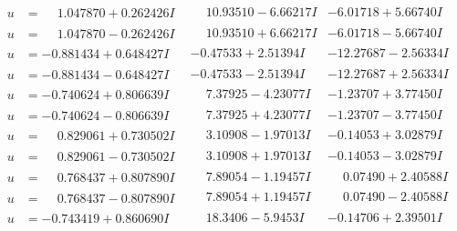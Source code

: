 \documentclass[1p]{elsarticle_modified}
\theoremstyle{definition}
\begin{document}
$$\begin{array}{c|c|c}
\begin{aligned}
u &= \phantom{-}1.047870 + 0.262426 I\end{aligned}
 & \phantom{-}10.93510 - 6.66217 I & -6.01718 + 5.66740 I \\ \hline\begin{aligned}
u &= \phantom{-}1.047870 - 0.262426 I\end{aligned}
 & \phantom{-}10.93510 + 6.66217 I & -6.01718 - 5.66740 I \\ \hline\begin{aligned}
u &= -0.881434 + 0.648427 I\end{aligned}
 & -0.47533 + 2.51394 I & -12.27687 - 2.56334 I \\ \hline\begin{aligned}
u &= -0.881434 - 0.648427 I\end{aligned}
 & -0.47533 - 2.51394 I & -12.27687 + 2.56334 I \\ \hline\begin{aligned}
u &= -0.740624 + 0.806639 I\end{aligned}
 & \phantom{-}7.37925 - 4.23077 I & -1.23707 + 3.77450 I \\ \hline\begin{aligned}
u &= -0.740624 - 0.806639 I\end{aligned}
 & \phantom{-}7.37925 + 4.23077 I & -1.23707 - 3.77450 I \\ \hline\begin{aligned}
u &= \phantom{-}0.829061 + 0.730502 I\end{aligned}
 & \phantom{-}3.10908 - 1.97013 I & -0.14053 + 3.02879 I \\ \hline\begin{aligned}
u &= \phantom{-}0.829061 - 0.730502 I\end{aligned}
 & \phantom{-}3.10908 + 1.97013 I & -0.14053 - 3.02879 I \\ \hline\begin{aligned}
u &= \phantom{-}0.768437 + 0.807890 I\end{aligned}
 & \phantom{-}7.89054 - 1.19457 I & \phantom{-}0.07490 + 2.40588 I \\ \hline\begin{aligned}
u &= \phantom{-}0.768437 - 0.807890 I\end{aligned}
 & \phantom{-}7.89054 + 1.19457 I & \phantom{-}0.07490 - 2.40588 I \\ \hline\begin{aligned}
u &= -0.743419 + 0.860690 I\end{aligned}
 & \phantom{-}18.3406 - 5.9453 I & -0.14706 + 2.39501 I \\ \hline\begin{aligned}

\end{aligned}
\end{array}$$
\end{document}
